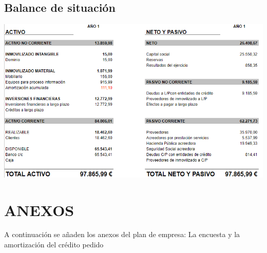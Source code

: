 \documentclass[openany,overnay,a4paper, twoside, 12pt]{book}
\begin{document}
\newpage
\section{Balance de situación}
\includegraphics[scale = 0.7]{balanceSituacion.png}



\chapter*{ANEXOS}
A continuación se añaden los anexos del plan de empresa: La encuesta y la amortización del crédito pedido 


\end{document}
